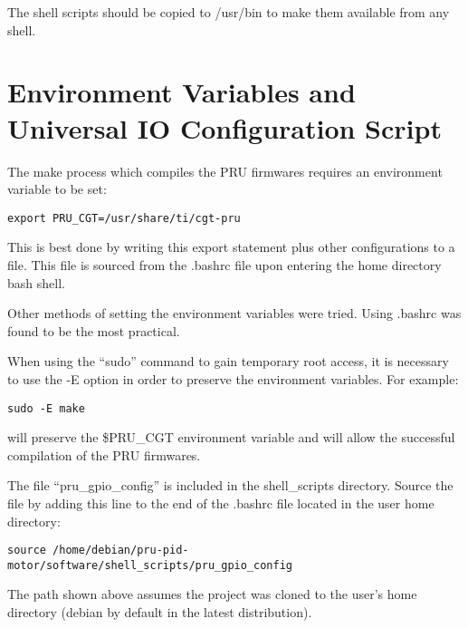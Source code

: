 	The shell scripts should be copied to /usr/bin to make them available from any shell.
	
\section{Environment Variables and Universal IO Configuration Script}

The make process which compiles the PRU firmwares requires an environment variable to be set:

\begin{verbatim}
export PRU_CGT=/usr/share/ti/cgt-pru
\end{verbatim}

This is best done by writing this export statement plus other configurations to a file.
This file is sourced from the .bashrc file upon entering the home directory bash shell.

Other methods of setting the environment variables were tried. Using .bashrc was found to be the most practical.

When using the ``sudo'' command to gain temporary root access, it is necessary to use the -E option in order to preserve the environment variables.  For example:

\begin{verbatim}
sudo -E make
\end{verbatim}

will preserve the \$PRU\_CGT environment variable and will allow the successful compilation of the PRU firmwares.

The file ``pru\_gpio\_config'' is included in the shell\_scripts directory.  Source the file by adding this line to the end of the .bashrc file located in the user home directory:

\begin{verbatim}
source /home/debian/pru-pid-motor/software/shell_scripts/pru_gpio_config
\end{verbatim}

The path shown above assumes the project was cloned to the user's home directory (debian by default in the latest distribution).

